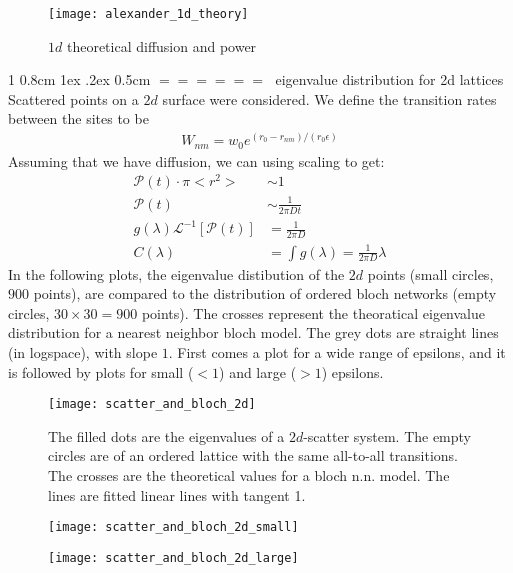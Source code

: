 \documentclass[onecolumn,fleqn,notitlepage,secnumarabic]{revtex4}
\makeatletter
\def\section{%
  \@startsection
    {section}%
    {1}%
    {\z@}%
    {0.8cm \@plus1ex \@minus .2ex}%
    {0.5cm}%
    {\Large\bf $=\!=\!=\!=\!=\!=\;$}%
}%
\makeatother
\begin{document}
\begin{figure}[H]
\texttt{[image: alexander\_1d\_theory]}
\caption{$1d$ theoretical diffusion and power}
\end{figure}

\section{eigenvalue distribution for 2d lattices}
Scattered points on a $2d$ surface were considered. We define the transition rates between the sites to be 
\begin{align}   W_{nm} = w_0 e^{(r_0 - r_{nm})/(r_0\epsilon)} \end{align}  
Assuming that we have diffusion, we can using scaling to get:
\begin{align} 
    \mathcal{P}(t) \cdot \pi <r^2> &\sim 1 \\
    \mathcal{P}(t) &\sim \frac{1}{2\pi Dt}\\
    g(\lambda)\mathcal{L}^{-1}\left[\mathcal{P}(t)\right]&= \frac{1}{2\pi D} \\
    C(\lambda) &= \int g(\lambda) = \frac{1}{2\pi D}\lambda
\end{align}
In the following plots, the eigenvalue distibution of the $2d$ points (small circles, $900$ points), are compared to the distribution of ordered bloch networks (empty circles, $30\times30=900$ points). The crosses represent the theoratical eigenvalue distribution for a nearest neighbor bloch model. The grey dots are straight lines (in logspace), with slope $1$. First comes a plot for a wide range of epsilons, and it is followed by plots for small ($<1$) and large ($>1$) epsilons.

\begin{figure}[H]
\texttt{[image: scatter\_and\_bloch\_2d]}
\caption{The filled dots are the eigenvalues of a $2d$-scatter system. The empty circles are of an ordered lattice with the same all-to-all transitions. The crosses are the theoretical values for a bloch n.n. model. The lines are fitted linear lines with tangent 1.}
\end{figure}
\begin{figure}[H]
\texttt{[image: scatter\_and\_bloch\_2d\_small]}
\caption{}
\end{figure}
\begin{figure}[H]
\texttt{[image: scatter\_and\_bloch\_2d\_large]}
\end{figure}
\end{document}
